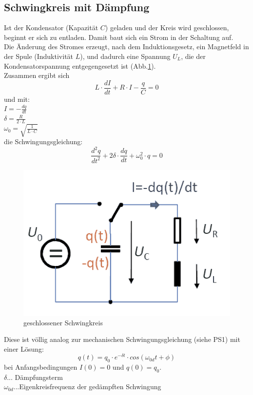 \documentclass[12pt,a4paper]{article}
\begin{document}
\begin{multicols}{2}
\subsection{Schwingkreis mit Dämpfung}
\noindent Ist der Kondensator (Kapazität $C$) geladen und der Kreis wird geschlossen, beginnt er sich zu entladen. Damit baut sich ein Strom in der Schaltung auf.\\
Die Änderung des Stromes erzeugt, nach dem Induktionsgesetz, ein Magnetfeld in der Spule (Induktivität $L$), und dadurch eine Spannung $U_L$, die der Kondensatorspannung entgegengesetzt ist (Abb.\ref{fig:schwingkreis_skizze}).\\
Zusammen ergibt sich
$$L\cdot \frac{dI}{dt} + R\cdot I - \frac{q}{C} = 0$$
und mit:\\
\indent $I = -\frac{dq}{dt}$\\
\indent $\delta = \frac{R}{2\cdot L}$\\
\indent $\omega_0=\sqrt{\frac{1}{L\cdot C}}$\\
die Schwingungsgleichung:
$$\frac{d^2q}{dt^2} + 2\delta\cdot \frac{dq}{dt} + \omega_0^2\cdot q = 0$$


\begin{figure}[H]
	\centering
	\includegraphics[scale=1.1]{./figure/schwingkreis_skizze.png}
	\caption{geschlossener Schwingkreis}
	\label{fig:schwingkreis_skizze}
\end{figure}



\noindent Diese ist völlig analog zur mechanischen Schwingungsgleichung (siehe PS1) mit einer Lösung:
$$q(t) = q_0 \cdot e^{-\delta t}\cdot cos(\omega_{0d}t  + \phi)$$
\noindent bei Anfangsbedingungen $I(0) = 0$ und $q(0) = q_0$.\\
$\delta$... Dämpfungsterm\\
$\omega_{0d}$...Eigenkreisfrequenz der gedämpften Schwingung\\


\end{multicols}
\end{document}
